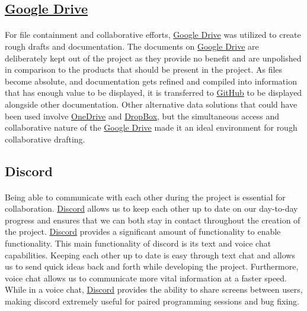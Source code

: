 \documentclass[12pt]{article}
\begin{document}
\subsection{\href{https://drive.google.com}{Google Drive}}
\paragraph{}	For file containment and collaborative efforts, \href{https://drive.google.com}{Google Drive} was utilized to create rough drafts and documentation. The documents on \href{https://drive.google.com}{Google Drive} are deliberately kept out of the project as they provide no benefit and are unpolished in comparison to the products that should be present in the project. As files become absolute, and documentation gets refined and compiled into information that has enough value to be displayed, it is transferred to \href{https://github.com}{GitHub} to be displayed alongside other documentation. Other alternative data solutions that could have been used involve \href{https://onedrive.live.com/}{OneDrive} and \href{https://dropbox.com}{DropBox}, but the simultaneous access and collaborative nature of the \href{https://drive.google.com}{Google Drive} made it an ideal environment for rough collaborative drafting. 

\subsection{Discord}
\paragraph{}
	Being able to communicate with each other during the project is essential for collaboration. \href{https://discordapp.com/}{Discord} allows us to keep each other up to date on our day-to-day progress and ensures that we can both stay in contact throughout the creation of the project. \href{https://discordapp.com/}{Discord} provides a significant amount of functionality to enable functionality. This main functionality of discord is its text and voice chat capabilities. Keeping each other up to date is easy through text chat and allows us to send quick ideas back and forth while developing the project. Furthermore, voice chat allows us to communicate more vital information at a faster speed. While in a voice chat, \href{https://discordapp.com/}{Discord} provides the ability to share screens between users, making discord extremely useful for paired programming sessions and bug fixing.
\end{document}
